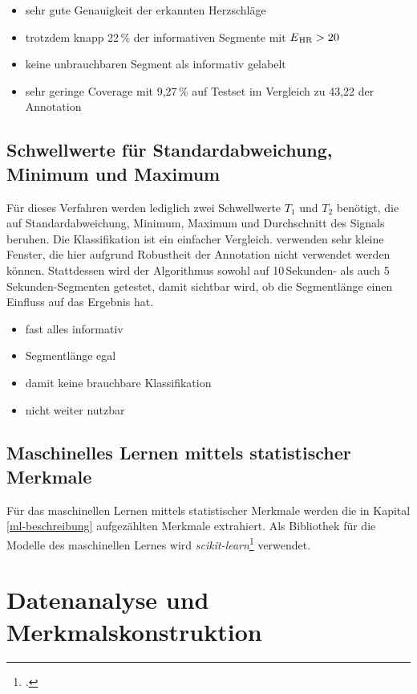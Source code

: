 \begin{itemize}
	\item sehr gute Genauigkeit der erkannten Herzschläge
	\item trotzdem knapp 22\,\% der informativen Segmente mit $E\textsubscript{HR} > 20$
	\item keine unbrauchbaren Segment als informativ gelabelt
	\item sehr geringe Coverage mit 9{,}27\,\% auf Testset im Vergleich zu 43{,}22 der Annotation
\end{itemize}


\subsection{Schwellwerte für Standardabweichung, Minimum und Maximum}

Für dieses Verfahren werden lediglich zwei Schwellwerte $T_1$ und $T_2$ benötigt, die auf Standardabweichung, Minimum, Maximum und Durchschnitt des Signals beruhen. Die Klassifikation ist ein einfacher Vergleich. \citeauthor{Pino2015} verwenden sehr kleine Fenster, die hier aufgrund Robustheit der Annotation nicht verwendet werden können. Stattdessen wird der Algorithmus sowohl auf 10\,Sekunden- als auch 5\,Sekunden-Segmenten getestet, damit sichtbar wird, ob die Segmentlänge einen Einfluss auf das Ergebnis hat.

\begin{itemize}
	\item fast alles informativ
	\item Segmentlänge egal
	\item damit keine brauchbare Klassifikation
	\item nicht weiter nutzbar
\end{itemize}

\subsection{Maschinelles Lernen mittels statistischer Merkmale}

Für das maschinellen Lernen mittels statistischer Merkmale werden die in Kapital \ref{ml-beschreibung} aufgezählten Merkmale extrahiert. Als Bibliothek für die Modelle des maschinellen Lernes wird \textit{scikit-learn}\footcite[]{scikit-learn} verwendet.

\section{Datenanalyse und Merkmalskonstruktion}


